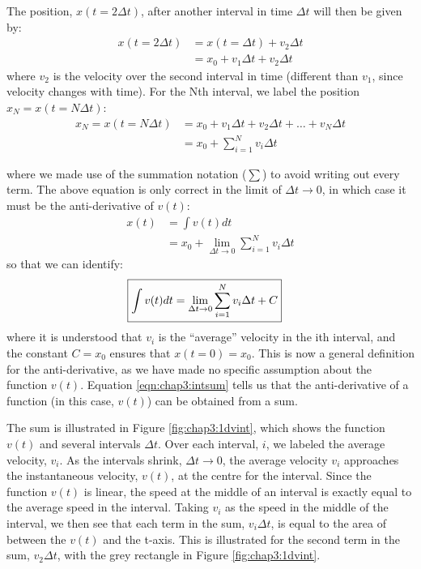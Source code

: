 The position, $x(t=2\Delta t)$, after another interval in time $\Delta t$ will then be given by:
\begin{align*}
x(t=2\Delta t) &= x(t=\Delta t)+v_2\Delta t\\
&=x_0+v_1\Delta t+v_2\Delta t
\end{align*}
where $v_2$ is the velocity over the second interval in time (different than $v_1$, since velocity changes with time). For the Nth interval, we label the position $x_N=x(t=N\Delta t)$:
\begin{align*}
x_N=x(t=N\Delta t)&=x_0+v_1\Delta t+v_2\Delta t+\dots+v_N\Delta t\\
&=x_0+\sum_{i=1}^Nv_i\Delta t 
\end{align*}


where we made use of the summation notation ($\sum$) to avoid writing out every term. The above equation is only correct in the limit of $\Delta t\to 0$, in which case it must be the anti-derivative of $v(t)$:
\begin{align*}
x(t) &= \int v(t) dt\\
     &= x_0+\lim_{\Delta t\to 0}\sum_{i=1}^Nv_i\Delta t 
\end{align*}
so that we can identify:
\begin{align}
\label{eqn:chap3:intsum}
\Aboxed{\int v(t) dt&=\lim_{\Delta t\to 0}\sum_{i=1}^Nv_i\Delta t + C}
\end{align}
where it is understood that $v_i$ is the ``average'' velocity in the ith interval, and the constant $C=x_0$ ensures that $x(t=0)=x_0$. This is now a general definition for the anti-derivative, as we have made no specific assumption about the function $v(t)$. Equation \ref{eqn:chap3:intsum} tells us that the anti-derivative of a function (in this case, $v(t)$) can be obtained from a sum.

The sum is illustrated in Figure \ref{fig:chap3:1dvint}, which shows the function $v(t)$ and several intervals $\Delta t$. Over each interval, $i$, we labeled the average velocity, $v_i$. As the intervals shrink, $\Delta t\to 0$, the average velocity $v_i$ approaches the instantaneous velocity, $v(t)$, at the centre for the interval. Since the function $v(t)$ is linear, the speed at the middle of an interval is exactly equal to the average speed in the interval. Taking $v_i$ as the speed in the middle of the interval, we then see that each term in the sum, $v_i\Delta t$, is equal to the area of between the $v(t)$ and the t-axis. This is illustrated for the second term in the sum, $v_2\Delta t$, with the grey rectangle in Figure \ref{fig:chap3:1dvint}.

